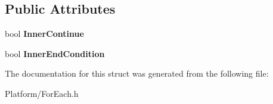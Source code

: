 \subsection*{Public Attributes}
\begin{DoxyCompactItemize}
\item 
\mbox{\label{struct_gost_crypt_1_1_for_each_1_1_container_a9ada0773874bd4b9fff2285a41c1f410}} 
bool {\bfseries Inner\+Continue}
\item 
\mbox{\label{struct_gost_crypt_1_1_for_each_1_1_container_ab851c52e01731508427f54c82fbd388a}} 
bool {\bfseries Inner\+End\+Condition}
\end{DoxyCompactItemize}


The documentation for this struct was generated from the following file\+:\begin{DoxyCompactItemize}
\item 
Platform/For\+Each.\+h\end{DoxyCompactItemize}
